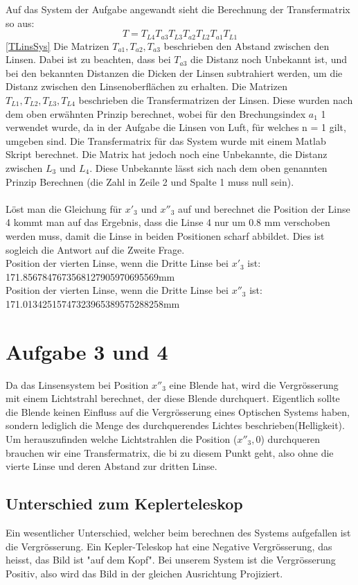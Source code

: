 \documentclass[11pt,twoside,a4paper]{article}
\begin{document}
	Auf das System der Aufgabe angewandt sieht die Berechnung der Transfermatrix so aus: 
	\begin{equation} \label{TLinsSys}
	T = T_{L4}T_{a3}T_{L3}T_{a2}T_{L2}T_{a1}T_{L1}
	\end{equation}
	\ref{TLinsSys} Die Matrizen \(T_{a1},T_{a2},T_{a3}\) beschrieben den Abstand zwischen den Linsen. Dabei ist zu beachten, dass bei \(T_{a3}\) die Distanz noch Unbekannt ist, und bei den bekannten Distanzen die Dicken der Linsen subtrahiert werden, um die Distanz zwischen den Linsenoberflächen zu erhalten. Die Matrizen \(T_{L1},T_{L2},T_{L3},T_{L4}\) beschrieben die Transfermatrizen der Linsen. Diese wurden nach dem oben erwähnten Prinzip berechnet, wobei für den Brechungsindex \(a_{1}\) 1 verwendet wurde, da in der Aufgabe die Linsen von Luft, für welches n = 1 gilt, umgeben sind.
	Die Transfermatrix für das System wurde mit einem Matlab Skript berechnet. Die Matrix hat jedoch noch eine Unbekannte, die Distanz zwischen \(L_{3}\) und \(L_{4}\). Diese Unbekannte lässt sich nach dem oben genannten Prinzip Berechnen (die Zahl in Zeile 2 und Spalte 1 muss null sein). \\
	\\
	Löst man die Gleichung für \(x'_{3}\) und \(x''_{3}\) auf und berechnet die Position der Linse 4 kommt man auf das Ergebnis, dass die Linse 4 nur um 0.8 mm verschoben werden muss, damit die Linse in beiden Positionen scharf abbildet. Dies ist sogleich die Antwort auf die Zweite Frage. \\
	Position der vierten Linse, wenn die Dritte Linse bei \(x'_{3}\) ist: 171.8567847673568127905970695569mm \\
	Position der vierten Linse, wenn die Dritte Linse bei \(x''_{3}\) ist: 171.01342515747323965389575288258mm \\
	\section{Aufgabe 3 und 4}
	Da das Linsensystem bei Position \(x''_{3}\) eine Blende hat, wird die Vergrösserung mit einem Lichtstrahl berechnet, der diese Blende durchquert. Eigentlich sollte die Blende keinen Einfluss auf die Vergrösserung eines Optischen Systems haben, sondern lediglich die Menge des durchquerendes Lichtes beschrieben(Helligkeit). \\
	Um herauszufinden welche Lichtstrahlen die Position (\(x''_{3},0\)) durchqueren brauchen wir eine Transfermatrix, die bi zu diesem Punkt geht, also ohne die vierte Linse und deren Abstand zur dritten Linse.
	\subsection{Unterschied zum Keplerteleskop}
	Ein wesentlicher Unterschied, welcher beim berechnen des Systems aufgefallen ist die Vergrösserung. Ein Kepler-Teleskop hat eine Negative Vergrösserung, das heisst, das Bild ist "auf dem Kopf". Bei unserem System ist die Vergrösserung Positiv, also wird das Bild in der gleichen Ausrichtung Projiziert. 
\end{document}
